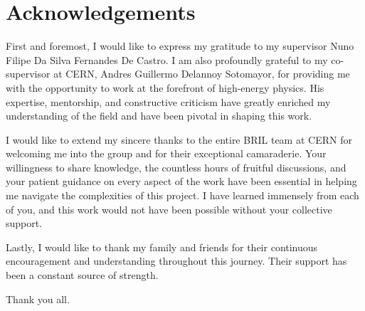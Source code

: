 \chapter*{Acknowledgements}
\setlength{\parskip}{1em}

First and foremost, I would like to express my gratitude to my supervisor Nuno Filipe Da Silva Fernandes De Castro. I am also profoundly grateful to my co-supervisor at CERN, Andres Guillermo Delannoy Sotomayor, for providing me with the opportunity to work at the forefront of high-energy physics. His expertise, mentorship, and constructive criticism have greatly enriched my understanding of the field and have been pivotal in shaping this work.

I would like to extend my sincere thanks to the entire BRIL team at CERN for welcoming me into the group and for their exceptional camaraderie. Your willingness to share knowledge, the countless hours of fruitful discussions, and your patient guidance on every aspect of the work have been essential in helping me navigate the complexities of this project. I have learned immensely from each of you, and this work would not have been possible without your collective support.

Lastly, I would like to thank my family and friends for their continuous encouragement and understanding throughout this journey. Their support has been a constant source of strength.

Thank you all.

\setlength{\parskip}{0em}